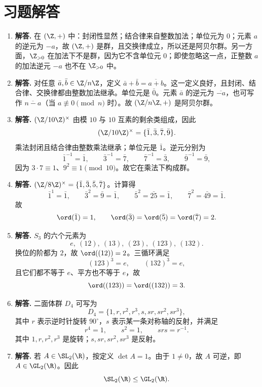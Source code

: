 \section*{习题解答}
\begin{enumerate}[label=\textbf{\arabic*.}, leftmargin=*, itemsep=1em]
\item \textbf{解答.} 在 $(\Z,+)$ 中：封闭性显然；结合律来自整数加法；单位元为 $0$；元素 $a$ 的逆元为 $-a$，故 $(\Z,+)$ 是群，且交换律成立，所以还是阿贝尔群。另一方面，$\Z_{>0}$ 在加法下不是群，因为它不含单位元 $0$；即使忽略这一点，正整数 $a$ 的加法逆元 $-a$ 也不在 $\Z_{>0}$ 中。

\item \textbf{解答.} 对任意 $\bar a,\bar b\in \Z/n\Z$，定义 $\bar a+\bar b=\overline{a+b}$。这一定义良好，且封闭、结合律、交换律都由整数加法继承。单位元是 $\bar0$。元素 $\bar a$ 的逆元为 $\overline{-a}$，也可写作 $\overline{n-a}$（当 $a\not\equiv0\pmod n$ 时）。故 $(\Z/n\Z,+)$ 是阿贝尔群。

\item \textbf{解答.} $(\Z/10\Z)^\times$ 由模 $10$ 与 $10$ 互素的剩余类组成，因此
\[
(\Z/10\Z)^\times=\{\bar1,\bar3,\bar7,\bar9\}.
\]
乘法封闭且结合律由整数乘法继承；单位元是 $\bar1$。逆元分别为
\[
\bar1^{-1}=\bar1,\qquad \bar3^{-1}=\bar7,\qquad \bar7^{-1}=\bar3,\qquad \bar9^{-1}=\bar9,
\]
因为 $3\cdot7\equiv1$、$9^2\equiv1\pmod{10}$。故它在乘法下构成群。

\item \textbf{解答.} $(\Z/8\Z)^\times=\{\bar1,\bar3,\bar5,\bar7\}$。计算得
\[
\bar1^1=\bar1,\qquad \bar3^2=\bar9=\bar1,\qquad \bar5^2=\bar{25}=\bar1,\qquad \bar7^2=\bar{49}=\bar1.
\]
故
\[
\ord(\bar1)=1,\qquad \ord(\bar3)=\ord(\bar5)=\ord(\bar7)=2.
\]

\item \textbf{解答.} $S_3$ 的六个元素为
\[
e,\ (12),\ (13),\ (23),\ (123),\ (132).
\]
换位的阶都为 $2$，故 $\ord((12))=2$。三循环满足
\[
(123)^3=e,\qquad (132)^3=e,
\]
且它们都不等于 $e$、平方也不等于 $e$，故
\[
\ord((123))=\ord((132))=3.
\]

\item \textbf{解答.} 二面体群 $D_4$ 可写为
\[
D_4=\{1,r,r^2,r^3,s,sr,sr^2,sr^3\},
\]
其中 $r$ 表示逆时针旋转 $90^\circ$，$s$ 表示某一条对称轴的反射，并满足
\[
r^4=1,\qquad s^2=1,\qquad srs=r^{-1}.
\]
其中 $1,r,r^2,r^3$ 是旋转；$s,sr,sr^2,sr^3$ 是反射。

\item \textbf{解答.} 若 $A\in \SL_2(\R)$，按定义 $\det A=1$。由于 $1\neq0$，故 $A$ 可逆，即 $A\in \GL_2(\R)$。因此
\[
\SL_2(\R)\le \GL_2(\R).
\]


\end{enumerate}

